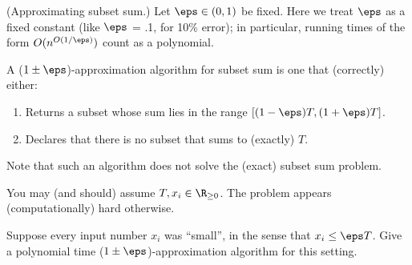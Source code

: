 \documentclass{article}
\begin{document}
\setcounter{section}{11}
\setcounter{exercise}{8}

 (Approximating subset sum.) Let $ \eps\in (0, 1)$ be fixed.
Here we treat $ \eps $ as a fixed constant (like $ \eps $ = .1, for 10\% error); in particular, running times of the form $ O(n^{O(1/\eps)}) $ count as a polynomial.

A ($ 1 \pm \eps $)-approximation algorithm for subset sum is one that (correctly) either: \begin{enumerate}
  \item Returns a subset whose sum lies in the range $[( 1-\eps )T , ( 1+\eps )T ]$.
  \item Declares that there is no subset that sums to (exactly) $T$.
\end{enumerate}
Note that such an algorithm does not solve the (exact) subset sum problem.

\begin{note}
  You may (and should) assume $ T,x_i\in\R_{\geq 0} $. The problem appears (computationally) hard otherwise.
\end{note}


\begin{subexercise}\label{qs:small}
  Suppose every input number $ x_i $ was ``small'', in the sense that $ x_i \leq \eps T $. Give a polynomial time ($ 1\pm \eps $)-approximation algorithm for this setting.
\end{subexercise}
\end{document}
